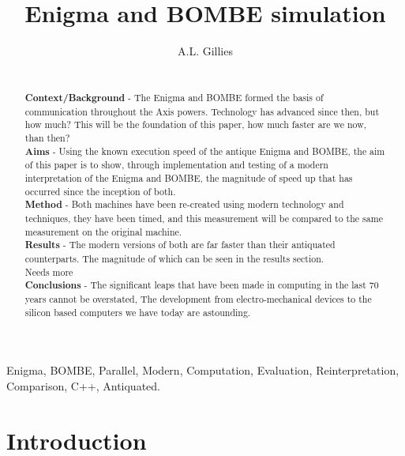 \documentclass[12pt,a4paper]{article}
\title{Enigma and BOMBE simulation}
\author{A.L. Gillies}
\date{}
\begin{document}
\maketitle

\begin{abstract}\\

{\bf Context/Background} - The Enigma and BOMBE formed the basis of communication throughout the Axis powers. Technology has advanced since then, but how much? This will be the foundation of this paper, how much faster are we now, than then?\\

{\bf Aims} - Using the known execution speed of the antique Enigma and BOMBE, the aim of this paper is to show, through implementation and testing of a modern interpretation of the Enigma and BOMBE, the magnitude of speed up that has occurred since the inception of both.\\

{\bf Method} - Both machines have been re-created using modern technology and techniques, they have been timed, and this measurement will be compared to the same measurement on the original machine.\\

{\bf Results} - The modern versions of both are far faster than their antiquated counterparts. The magnitude of which can be seen in the results section.\\ Needs more \\

{\bf Conclusions} - The significant leaps that have been made in computing in the last 70 years cannot be overstated, The development from electro-mechanical devices to the silicon based computers we have today are astounding.
\end{abstract}

\begin{keywords}
Enigma, BOMBE, Parallel, Modern, Computation, Evaluation, Reinterpretation, Comparison, C++, Antiquated.
\end{keywords}



\section{Introduction}

\end{document}
